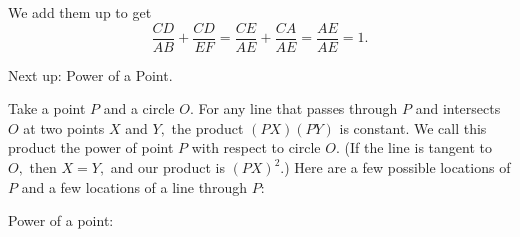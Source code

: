 







We add them up to get $$\frac{CD}{AB} + \frac{CD}{EF} = \frac{CE}{AE} + \frac{CA}{AE} = \frac{AE}{AE} = 1.$$

Next up: Power of a Point.

Take a point $P$ and a circle $O.$  For any line that passes through $P$ and intersects $O$ at two points $X$ and $Y,$ the product $(PX)(PY)$ is constant. We call this product the power of point $P$ with respect to circle $O.$  (If the line is tangent to $O,$ then $X = Y,$ and our product is $(PX)^2.$)  Here are a few possible locations of $P$ and a few locations of a line through $P:$

Power of a point:




